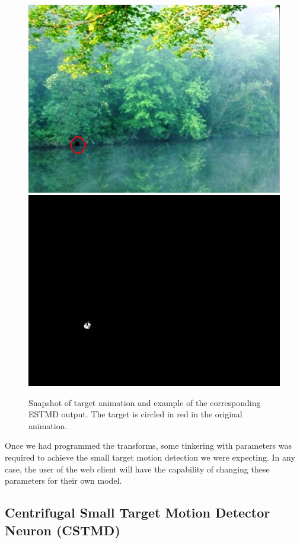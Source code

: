 \documentclass[a4paper,11pt]{article}
\begin{document}
\begin{figure}[h]
\includegraphics[scale = 0.4]{input}
\includegraphics[scale = 0.5]{processed}
\caption{Snapshot of target animation and example of the corresponding ESTMD output. The target is circled in red in the original animation.}
\end{figure}

Once we had programmed the transforms, some tinkering with parameters was required to achieve the small target motion detection we were expecting. In any case, the user of the web client will have the capability of changing these parameters for their own model.

\subsection{Centrifugal Small Target Motion Detector Neuron (CSTMD)}
\end{document}
